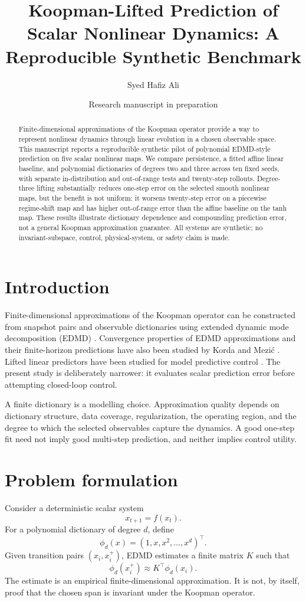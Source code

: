 \documentclass[11pt]{article}
\title{Koopman-Lifted Prediction of Scalar Nonlinear Dynamics: A Reproducible Synthetic Benchmark}
\author{Syed Hafiz Ali}
\date{Research manuscript in preparation}
\begin{document}
\maketitle

\begin{abstract}
Finite-dimensional approximations of the Koopman operator provide a way to represent nonlinear dynamics through linear evolution in a chosen observable space. This manuscript reports a reproducible synthetic pilot of polynomial EDMD-style prediction on five scalar nonlinear maps. We compare persistence, a fitted affine linear baseline, and polynomial dictionaries of degrees two and three across ten fixed seeds, with separate in-distribution and out-of-range tests and twenty-step rollouts. Degree-three lifting substantially reduces one-step error on the selected smooth nonlinear maps, but the benefit is not uniform: it worsens twenty-step error on a piecewise regime-shift map and has higher out-of-range error than the affine baseline on the tanh map. These results illustrate dictionary dependence and compounding prediction error, not a general Koopman approximation guarantee. All systems are synthetic; no invariant-subspace, control, physical-system, or safety claim is made.
\end{abstract}

\section{Introduction}
Finite-dimensional approximations of the Koopman operator can be constructed from snapshot pairs and observable dictionaries using extended dynamic mode decomposition (EDMD) \cite{williams2015edmd}. Convergence properties of EDMD approximations and their finite-horizon predictions have also been studied by Korda and Mezić \cite{korda2018convergence}. Lifted linear predictors have been studied for model predictive control \cite{korda2018mpc}. The present study is deliberately narrower: it evaluates scalar prediction error before attempting closed-loop control.

A finite dictionary is a modelling choice. Approximation quality depends on dictionary structure, data coverage, regularization, the operating region, and the degree to which the selected observables capture the dynamics. A good one-step fit need not imply good multi-step prediction, and neither implies control utility.

\section{Problem formulation}
Consider a deterministic scalar system
\[
x_{t+1}=f(x_t).
\]
For a polynomial dictionary of degree $d$, define
\[
\phi_d(x)=(1,x,x^2,\ldots,x^d)^\top.
\]
Given transition pairs $(x_i,x_i^+)$, EDMD estimates a finite matrix $K$ such that
\[
\phi_d(x_i^+)\approx K^\top\phi_d(x_i).
\]
The estimate is an empirical finite-dimensional approximation. It is not, by itself, proof that the chosen span is invariant under the Koopman operator.
\end{document}

